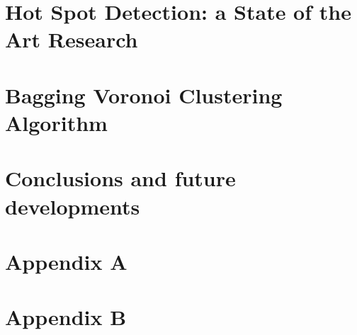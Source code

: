 \documentclass{Configuration_Files/PoliMi3i_thesis}
\begin{document}

\chapter{Hot Spot Detection: a State of the Art Research}
\label{ch:state_ot_the_art}



\chapter{Bagging Voronoi Clustering Algorithm}
\label{ch:baggingvoronoi}



\chapter{Conclusions and future developments}
\label{ch:conclusions}






\cleardoublepage
{} %
\appendix

\chapter{Appendix A}
\label{ap:research}


\chapter{Appendix B}
\label{ap:Python}%


\cleardoublepage
\end{document}
